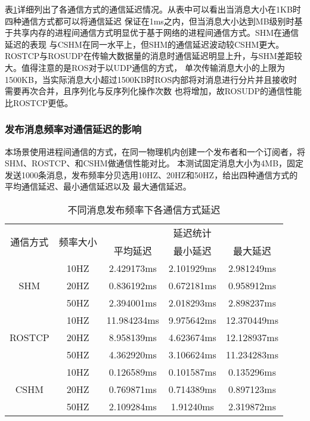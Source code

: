 表\ref{one_to_one}详细列出了各通信方式的通信延迟情况。从表中可以看出当消息大小在1KB时四种通信方式都可以将通信延迟
保证在1ms之内，但当消息大小达到MB级别时基于共享内存的进程间通信方式明显优于基于网络的进程间通信方式。SHM在通信延迟的表现
与CSHM在同一水平上，但SHM的通信延迟波动较CSHM更大。ROSTCP与ROSUDP在传输大数据量的消息时通信延迟明显上升，与SHM差距较大。值得注意的是ROS对于以UDP通信的方式，
单次传输消息大小的上限为1500KB，当实际消息大小超过1500KB时ROS内部将对消息进行分片并且接收时需要再次合并，且序列化与反序列化操作次数
也将增加，故ROSUDP的通信性能比ROSTCP更低。

\subsubsection{发布消息频率对通信延迟的影响}
本场景使用进程间通信的方式，在同一物理机内创建一个发布者和一个订阅者，将SHM、ROSTCP、和CSHM做通信性能对比。
本测试固定消息大小为4MB，固定发送1000条消息，发布频率分贝选用10HZ、20HZ和50HZ，给出四种通信方式的平均通信延迟、最小通信延迟以及
最大通信延迟。

\begin{table}[htb]
  \centering\small
  \caption{不同消息发布频率下各通信方式延迟}
  \renewcommand\arraystretch{1.2}
  \label{one_to_one}
  \begin{tabular}{ccccc}
    \toprule
    \multirow{2}{*}{通信方式} & \multirow{2}{*}{频率大小} & \multicolumn{3}{c}{延迟统计}\\
     & & 平均延迟 & 最小延迟 & 最大延迟\\
    \midrule
    \multirow{3}{*}{SHM} & 10HZ& 2.429173ms& 2.101929ms& 2.981249ms\\ & 20HZ & 0.836192ms & 0.672181ms & 0.958912ms \\ & 50HZ & 2.394001ms & 2.018293ms & 2.898237ms \\
    \hline
    \multirow{3}{*}{ROSTCP} & 10HZ& 11.984234ms& 9.975642ms& 12.370449ms\\ & 20HZ & 8.958139ms & 4.623674ms & 12.128937ms \\ & 50HZ & 4.362920ms & 3.106624ms & 11.234283ms \\
    \hline
    \multirow{3}{*}{CSHM} & 10HZ& 0.126589ms& 0.101587ms& 0.135296ms\\ & 20HZ & 0.769871ms & 0.714389ms & 0.897123ms \\ & 50HZ & 2.109284ms & 1.91240ms & 2.319872ms \\
    \bottomrule
  \end{tabular}
\end{table}

